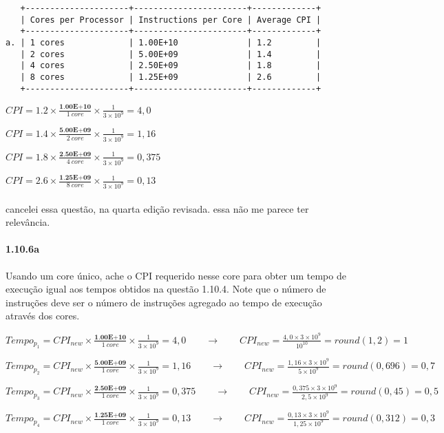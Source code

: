 \documentclass{article}
\begin{document}
\begin{verbatim}
   +---------------------+-----------------------+-------------+
   | Cores per Processor | Instructions per Core | Average CPI |
   +---------------------+-----------------------+-------------+
a. | 1 cores             | 1.00E+10              | 1.2         |
   | 2 cores             | 5.00E+09              | 1.4         |
   | 4 cores             | 2.50E+09              | 1.8         |
   | 8 cores             | 1.25E+09              | 2.6         |
   +---------------------+-----------------------+-------------+
\end{verbatim}

$CPI = 1.2 \times \frac{\textbf{1.00E+10}}{1\ core} \times \frac{1}{3 \times 
10^{9}} = 4,0$

$CPI = 1.4 \times \frac{\textbf{5.00E+09}}{2\ core} \times \frac{1}{3 \times 
10^{9}} = 1,16$

$CPI = 1.8 \times \frac{\textbf{2.50E+09}}{4\ core} \times \frac{1}{3 \times 
10^{9}} = 0,375$

$CPI = 2.6 \times \frac{\textbf{1.25E+09}}{8\ core} \times \frac{1}{3 \times 
10^{9}} = 0,13$

\paragraph{} cancelei essa questão, na quarta edição 
revisada. essa não me parece ter relevância.

\clearpage
\paragraph{1.10.6a} Usando um core único, ache o CPI requerido nesse core para 
obter um tempo de execução igual aos tempos obtidos na questão 1.10.4. Note que 
o número de instruções deve ser o número de instruções agregado ao tempo de 
execução através dos cores.

$Tempo_{p_{1}} = CPI_{new} \times \frac{\textbf{1.00E+10}}{1\ core} \times 
\frac{1}{3 \times 10^{9}} = 4,0 \qquad \rightarrow \qquad CPI_{new} = \frac{4,0 
\times 3 \times 10^{9}}{10^{10}} = round(1,2) = 1$

$Tempo_{p_{2}} = CPI_{new} \times \frac{\textbf{5.00E+09}}{1\ core} \times 
\frac{1}{3 \times 10^{9}} = 1,16 \qquad \rightarrow \qquad CPI_{new} = 
\frac{1,16 \times 3 \times 10^{9}}{5 \times 10^{9}} = round(0,696) = 0,7$

$Tempo_{p_{3}} = CPI_{new} \times \frac{\textbf{2.50E+09}}{1\ core} \times 
\frac{1}{3 \times 10^{9}} = 0,375 \qquad \rightarrow \qquad CPI_{new} = 
\frac{0,375 \times 3 \times 10^{9}}{2,5 \times 10^{9}} = round(0,45) = 0,5$

$Tempo_{p_{4}} = CPI_{new} \times \frac{\textbf{1.25E+09}}{1\ core} \times 
\frac{1}{3 \times 10^{9}} = 0,13 \qquad \rightarrow \qquad CPI_{new} = 
\frac{0,13 \times 3 \times 10^{9}}{1,25 \times 10^{9}} = round(0,312) = 0,3$
\end{document}
